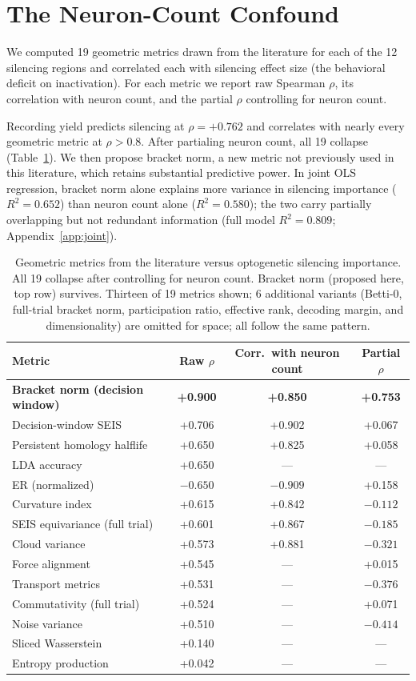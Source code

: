 \documentclass{article}
\begin{document}
\section{The Neuron-Count Confound}
\label{sec:confound}

We computed 19 geometric metrics drawn from the literature for each of the 12 silencing regions and correlated each with silencing effect size (the behavioral deficit on inactivation). For each metric we report raw Spearman $\rho$, its correlation with neuron count, and the partial $\rho$ controlling for neuron count.

Recording yield predicts silencing at $\rho = +0.762$ and correlates with nearly every geometric metric at $\rho > 0.8$. After partialing neuron count, all 19 collapse (Table~\ref{tab:confound}). We then propose bracket norm, a new metric not previously used in this literature, which retains substantial predictive power. In joint OLS regression, bracket norm alone explains more variance in silencing importance ($R^2 = 0.652$) than neuron count alone ($R^2 = 0.580$); the two carry partially overlapping but not redundant information (full model $R^2 = 0.809$; Appendix~\ref{app:joint}).

\begin{table}[t]
\centering
\caption{Geometric metrics from the literature versus optogenetic silencing importance. All 19 collapse after controlling for neuron count. Bracket norm (proposed here, top row) survives. Thirteen of 19 metrics shown; 6 additional variants (Betti-0, full-trial bracket norm, participation ratio, effective rank, decoding margin, and dimensionality) are omitted for space; all follow the same pattern.}
\label{tab:confound}
\begin{tabular}{lccc}
\toprule
Metric & Raw $\rho$ & Corr.\ with neuron count & Partial $\rho$ \\
\midrule
\textbf{Bracket norm (decision window)} & \textbf{+0.900} & \textbf{+0.850} & \textbf{+0.753} \\
Decision-window SEIS & +0.706 & +0.902 & +0.067 \\
Persistent homology halflife & +0.650 & +0.825 & +0.058 \\
LDA accuracy & +0.650 & --- & --- \\
ER (normalized) & $-0.650$ & $-0.909$ & +0.158 \\
Curvature index & +0.615 & +0.842 & $-0.112$ \\
SEIS equivariance (full trial) & +0.601 & +0.867 & $-0.185$ \\
Cloud variance & +0.573 & +0.881 & $-0.321$ \\
Force alignment & +0.545 & --- & +0.015 \\
Transport metrics & +0.531 & --- & $-0.376$ \\
Commutativity (full trial) & +0.524 & --- & +0.071 \\
Noise variance & +0.510 & --- & $-0.414$ \\
Sliced Wasserstein & +0.140 & --- & --- \\
Entropy production & +0.042 & --- & --- \\
\bottomrule
\end{tabular}
\end{table}
\end{document}
